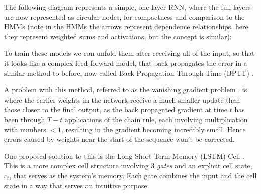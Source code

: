 \documentclass[bsc,singlespacing,logo, parskip, deptreport]{infthesis}
\begin{document}
The following diagram represents a simple, one-layer RNN, where the full layers are now represented as circular nodes, for compactness and comparison to the HMMs (note in the HMMs the arrows represent dependence relationships, here they represent weighted sums and activations, but the concept is similar):

\begin{center}
\end{center}

To train these models we can unfold them after receiving all of the input, so that it looks like a complex feed-forward model, that back propagates the error in a similar method to before, now called Back Propagation Through Time (BPTT) \cite{werbos1990backpropagation}.

A problem with this method, referred to as the vanishing gradient problem \cite{hochreiter1998vanishing}, is where the earlier weights in the network receive a much smaller update than those closer to the final output, as the back propagated gradient at time $t$ has been through $T - t$ applications of the chain rule, each involving multiplication with numbers $< 1$, resulting in the gradient becoming incredibly small. Hence errors caused by weights near the start of the sequence won't be corrected.

One proposed solution to this is the Long Short Term Memory (LSTM) Cell \cite{hochreiter1997long}. This is a more complex cell structure involving 3 {\em gates} and an explicit cell state, $c_t$, that serves as the system's memory. Each gate combines the input and the cell state in a way that serves an intuitive purpose.
\end{document}
